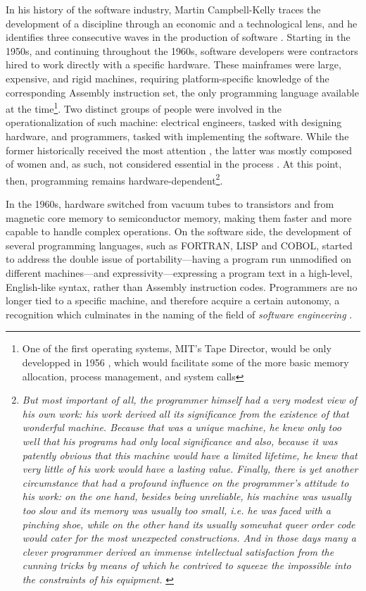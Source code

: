 In his history of the software industry, Martin Campbell-Kelly traces the development of a discipline through an economic and a technological lens, and he identifies three consecutive waves in the production of software \citep{campbell-kelly_airline_2003}. Starting in the 1950s, and continuing throughout the 1960s, software developers were contractors hired to work directly with a specific hardware. These mainframes were large, expensive, and rigid machines, requiring platform-specific knowledge of the corresponding Assembly instruction set, the only programming language available at the time\footnote{One of the first operating systems, MIT's Tape Director, would be only developped in 1956 \citep{ross_personal_1986}, which would facilitate some of the more basic memory allocation, process management, and system calls}. Two distinct groups of people were involved in the operationalization of such machine: electrical engineers, tasked with designing hardware, and programmers, tasked with implementing the software. While the former historically received the most attention \citep{ross_personal_1986}, the latter was mostly composed of women and, as such, not considered essential in the process \citep{light_when_1999}. At this point, then, programming remains hardware-dependent\footnote{\emph{But most important of all, the programmer himself had a very modest view of his own work: his work derived all its significance from the existence of that wonderful machine. Because that was a unique machine, he knew only too well that his programs had only local significance and also, because it was patently obvious that this machine would have a limited lifetime, he knew that very little of his work would have a lasting value. Finally, there is yet another circumstance that had a profound influence on the programmer's attitude to his work: on the one hand, besides being unreliable, his machine was usually too slow and its memory was usually too small, i.e. he was faced with a pinching shoe, while on the other hand its usually somewhat queer order code would cater for the most unexpected constructions. And in those days many a clever programmer derived an immense intellectual satisfaction from the cunning tricks by means of which he contrived to squeeze the impossible into the constraints of his equipment.} \citep{dijkstra_humble_2007}}.

In the 1960s, hardware switched from vacuum tubes to transistors and from magnetic core memory to semiconductor memory, making them faster and more capable to handle complex operations.  On the software side, the development of several programming languages, such as FORTRAN, LISP and COBOL, started to address the double issue of portability—having a program run unmodified on different machines—and expressivity—expressing a program text in a high-level, English-like syntax, rather than Assembly instruction codes. Programmers are no longer tied to a specific machine, and therefore acquire a certain autonomy, a recognition which culminates in the naming of the field of \emph{software engineering} \citep{randell_nato_1996}.

